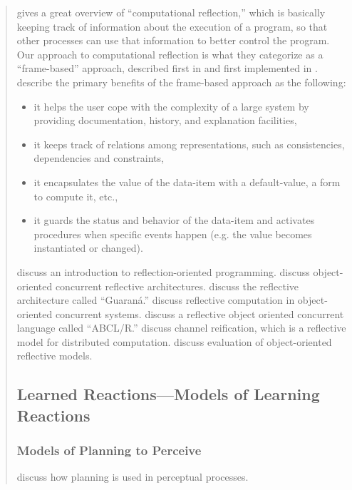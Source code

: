 \begin{quotation}
\cite{maes1987cecr} gives a great overview of ``computational reflection,'' which is basically keeping track of information about the execution of a program, so that other processes can use that information to better control the program.
Our approach to computational reflection is what they categorize as a ``frame-based'' approach, described first in \cite{minsky1975frk} and first implemented in \cite{roberts1977fpms}.
\cite{maes1987cecr} describe the primary benefits of the frame-based approach as the following:

\begin{itemize}
\item{it helps the user cope with the complexity of a large system by providing documentation, history, and explanation facilities,}
\item{it keeps track of relations among representations, such as consistencies, dependencies and constraints,}
\item{it encapsulates the value of the data-item with a default-value, a form to compute it, etc.,}
\item{it guards the status and behavior of the data-item and activates procedures when specific events happen (e.g. the value becomes instantiated or changed).}
\end{itemize}
	      
\cite{sobel96anintroduction} discuss an introduction to reflection-oriented programming.
\cite{matsuoka1992ocr} discuss object-oriented concurrent reflective architectures.
\cite{oliva1998rag} discuss the reflective architecture called ``Guaraná.''
\cite{watanabe1989rcoocsa} discuss reflective computation in object-oriented concurrent systems.
\cite{yonezawa1990roo} discuss a reflective object oriented concurrent language called ``ABCL/R.''
\cite{ancona1998cr} discuss channel reification, which is a reflective model for distributed computation.
\cite{cazzola1998eoo} discuss evaluation of object-oriented reflective models.

\subsection{Learned Reactions---Models of Learning Reactions}

\subsubsection{Models of Planning to Perceive}

\cite{pryorcollins1995ptp} discuss how planning is used in perceptual processes.
	      

\end{quotation}
